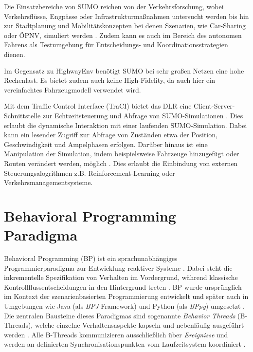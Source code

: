 Die Einsatzbereiche von SUMO reichen von der Verkehrsforschung, wobei Verkehrsflüsse, Engpässe oder Infrastrukturmaßnahmen untersucht werden bis hin zur Stadtplanung und Mobilitätskonzepten bei denen Szenarien, wie Car-Sharing oder ÖPNV, simuliert werden \cite{SUMO2018}. Zudem kann es auch im Bereich des autonomen Fahrens als Testumgebung für Entscheidungs- und Koordinationsstrategien dienen.

Im Gegensatz zu HighwayEnv benötigt SUMO bei sehr großen Netzen eine hohe Rechenlast. Es bietet zudem auch keine High-Fidelity, da auch hier ein vereinfachtes Fahrzeugmodell verwendet wird.

Mit dem Traffic Control Interface (TraCI) bietet das DLR eine Client-Server-Schnittstelle zur Echtzeitsteuerung und Abfrage von SUMO-Simulationen \cite{sumo_traci}. Dies erlaubt die dynamische Interaktion mit einer laufenden SUMO-Simulation. Dabei kann ein lesender Zugriff zur Abfrage von Zuständen etwa der Position, Geschwindigkeit und Ampelphasen erfolgen. Darüber hinaus ist eine Manipulation der Simulation, indem beispielsweise Fahrzeuge hinzugefügt oder Routen verändert werden, möglich \cite{sumo_traci}. Dies erlaubt die Einbindung von externen Steuerungsalogrithmen z.B. Reinforcement-Learning oder Verkehrsmanagementsysteme.

\section{Behavioral Programming Paradigma}\label{sec:behavioral-programming}
Behavioral Programming (BP) ist ein sprachunabhängiges Programmierparadigma zur Entwicklung reaktiver Systeme \cite{Harel2012}.
Dabei steht die inkrementelle Spezifikation von Verhalten im Vordergrund, während klassische Kontrollflussentscheidungen in den Hintergrund treten \cite{Harel2012}.
BP wurde ursprünglich im Kontext der szenarienbasierten Programmierung entwickelt und später auch in Umgebungen wie Java (als \emph{BPJ}-Framework) und Python (als \emph{BPpy}) umgesetzt \cite{Harel2010}.
Die zentralen Bausteine dieses Paradigmas sind sogenannte \emph{Behavior Threads} (B-Threads), welche einzelne Verhaltensaspekte kapseln und nebenläufig ausgeführt werden \cite{Harel2010}.
Alle B-Threads kommunizieren ausschließlich über \emph{Ereignisse} und werden an definierten Synchronisationspunkten vom Laufzeitsystem koordiniert \cite{Harel2012}.


